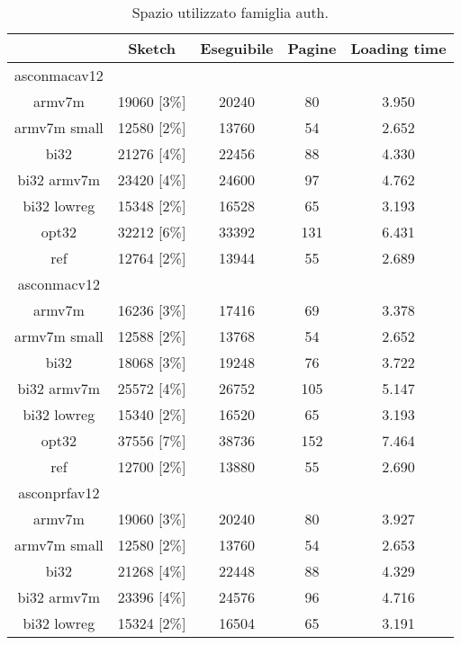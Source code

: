 \begin{table}[h]
    \caption{Spazio utilizzato famiglia auth.}
    \centering
	\begin{tabular}{|c|c|c|c|c|}
		\hline
         & Sketch & Eseguibile & Pagine & Loading time \\
        \hline
        asconmacav12 & & & & \\
        \hline
        armv7m & 19060 [3\%] & 20240 & 80 & 3.950 \\
        \hline
        armv7m small & 12580 [2\%] & 13760 & 54 & 2.652 \\
        \hline
        bi32 & 21276 [4\%] & 22456 & 88 & 4.330 \\
        \hline
        bi32 armv7m & 23420 [4\%] & 24600 & 97 & 4.762 \\
        \hline
        bi32 lowreg & 15348 [2\%] & 16528 & 65 & 3.193 \\
        \hline
        opt32 & 32212 [6\%] & 33392 & 131 & 6.431 \\
        \hline
        ref & 12764 [2\%] & 13944 & 55 & 2.689 \\
        \hline
        asconmacv12 & & & & \\
        \hline
        armv7m & 16236 [3\%] & 17416 & 69 & 3.378 \\
        \hline
        armv7m small & 12588 [2\%] & 13768 & 54 & 2.652 \\
        \hline
        bi32 & 18068 [3\%] & 19248 & 76 & 3.722 \\
        \hline
        bi32 armv7m & 25572 [4\%] & 26752 & 105 & 5.147 \\
        \hline
        bi32 lowreg & 15340 [2\%] & 16520 & 65 & 3.193 \\
        \hline
        opt32 & 37556 [7\%] & 38736 & 152 & 7.464 \\
        \hline
        ref & 12700 [2\%] & 13880 & 55 & 2.690 \\
        \hline
        asconprfav12 & & & & \\
        \hline
        armv7m & 19060 [3\%] & 20240 & 80 & 3.927 \\
        \hline
        armv7m small & 12580 [2\%] & 13760 & 54 & 2.653 \\
        \hline
        bi32 & 21268 [4\%] & 22448 & 88 & 4.329 \\
        \hline
        bi32 armv7m & 23396 [4\%] & 24576 & 96 & 4.716 \\
        \hline
        bi32 lowreg & 15324 [2\%] & 16504 & 65 & 3.191 \\

\end{tabular}
\end{table}
